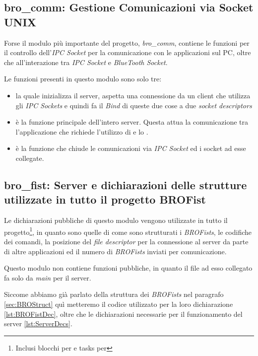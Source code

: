 \subsection[bro\_comm]{bro\_comm: Gestione Comunicazioni via Socket UNIX}
Forse il modulo più importante del progetto, \emph{bro\_comm}, contiene le
funzioni per il controllo dell'\emph{IPC Socket} per la comunicazione con
le applicazioni sul PC, oltre che all'interazione tra \emph{IPC Socket} e
\emph{BlueTooth Socket}.

Le funzioni presenti in questo modulo sono solo tre:
\begin{itemize}
    \item {} la quale
        inizializza il server, aspetta una connessione da un client che
        utilizza gli \emph{IPC Sockets} e quindi fa il \emph{Bind} di
        queste due cose a due \emph{socket descriptors}
    \item {} è la funzione principale dell'intero server. Questa
        attua la comunicazione tra l'applicazione che richiede l'utilizzo
        di \BROFist{} e lo \SPAM{}.
    \item {} è la funzione che chiude
        le comunicazioni via \emph{IPC Socket} ed i socket ad esse
        collegate.
\end{itemize}

\subsection[bro\_fist]{bro\_fist: Server e dichiarazioni delle strutture
utilizzate in tutto il progetto BROFist}
Le dichiarazioni pubbliche di questo modulo vengono utilizzate in tutto il
progetto\footnote{Inclusi blocchi per  e tasks per
\nxt{}}, in quanto sono quelle di come sono strutturati i \emph{BROFists},
le codifiche dei comandi, la posizione del \emph{file descriptor} per la
connessione al server da parte di altre applicazioni ed il numero di
\emph{BROFists} inviati per comunicazione.

Questo modulo non contiene funzioni pubbliche, in quanto il file
 ad esso collegato fa solo da \emph{main} per il server.

Siccome abbiamo già parlato della struttura dei \emph{BROFists} nel paragrafo
\ref{sec:BROStruct} quì metteremo il codice utilizzato per la loro
dichiarazione \ref{lst:BROFistDec}, oltre che le dichiarazioni necessarie
per il funzionamento del server \ref{lst:ServerDecs}.

